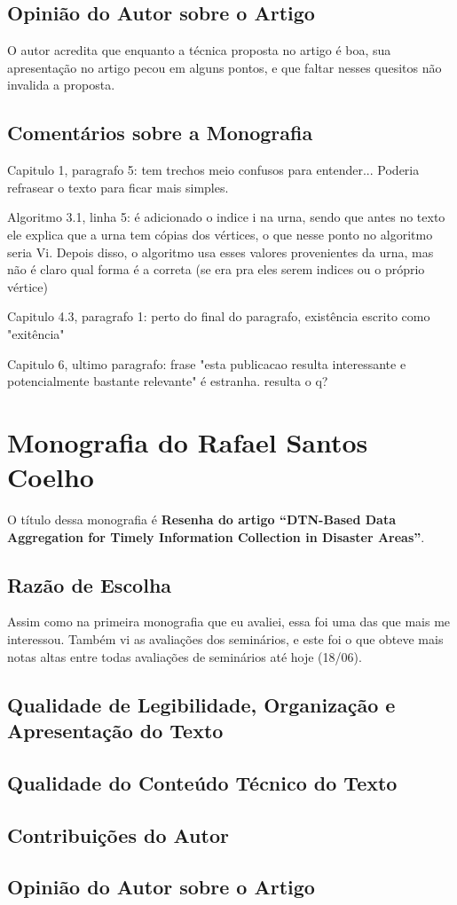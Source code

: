 \documentclass[a4paper,11pt]{article}
\begin{document}
\subsection{Opinião do Autor sobre o Artigo}
O autor acredita que enquanto a técnica proposta no artigo é boa, sua apresentação no artigo pecou 
em alguns pontos, e que faltar nesses quesitos não invalida a proposta. 

\subsection{Comentários sobre a Monografia}
Capitulo 1, paragrafo 5: tem trechos meio confusos para entender... Poderia refrasear o texto 
para ficar mais simples.

Algoritmo 3.1, linha 5: é adicionado o indice i na urna, sendo que antes no texto ele explica
que a urna tem cópias dos vértices, o que nesse ponto no algoritmo seria Vi.
Depois disso, o algoritmo usa esses valores provenientes da urna, mas não é claro
qual forma é a correta (se era pra eles serem indices ou o próprio vértice)

Capitulo 4.3, paragrafo 1: perto do final do paragrafo, existência escrito como "exitência"

Capitulo 6, ultimo paragrafo: frase "esta publicacao resulta interessante e potencialmente
bastante relevante" é estranha. resulta o q?


\pagebreak

\section{Monografia do Rafael Santos Coelho}
O título dessa monografia é \textbf{Resenha do artigo \textquotedblleft DTN-Based 
Data Aggregation for Timely Information Collection in Disaster Areas\textquotedblright }.

\subsection{Razão de Escolha}
Assim como na primeira monografia que eu avaliei, essa foi uma das que mais me interessou.
Também vi as avaliações dos seminários, e este foi o que obteve mais notas altas entre todas avaliações
de seminários até hoje (18/06).

\subsection{Qualidade de Legibilidade, Organização e Apresentação do Texto}
\subsection{Qualidade do Conteúdo Técnico do Texto}
\subsection{Contribuições do Autor} %
\subsection{Opinião do Autor sobre o Artigo}
\end{document}
